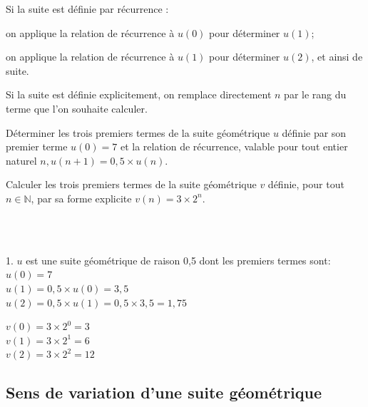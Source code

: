 \begin{methode}
	\begin{enumMet}
		\item Si la suite est définie par récurrence :
		\begin{itemMet}
			\item on applique la relation de récurrence à $u(0)$ pour déterminer $u(1)$;
			\item on applique la relation de récurrence à $u(1)$ pour déterminer $u(2)$, et ainsi de suite.
		\end{itemMet}
		\item Si la suite est définie explicitement, on remplace directement $n$ par le rang du terme que l'on souhaite calculer.
	\end{enumMet}
	
\end{methode}

\begin{exemple}
	\begin{enumEx}
		\item Déterminer les trois premiers termes de la suite géométrique $u$ définie par son premier terme $u(0)=7$ et la relation de récurrence, valable pour tout entier naturel $n, u(n+1)=0,5 \times u(n)$.
		\item Calculer les trois premiers termes de la suite géométrique $v$ définie, pour tout $n \in \mathbb{N}$, par sa forme explicite $v(n)=3 \times 2^n$.
	\end{enumEx}
	\ \\
	\\
	\begin{enumEx}
		\item 1. $u$ est une suite géométrique de raison 0,5 dont les premiers termes sont:
		$u(0)=7$\\
		$u(1)=0,5 \times u(0)=3,5$\\
		$u(2)=0,5 \times u(1)=0,5 \times 3,5=1,75$
		\item $v(0)=3 \times 2^0=3$ \\
		$v(1)=3 \times 2^1=6$\\
		$v(2)=3 \times 2^2=12$
	\end{enumEx}
\end{exemple}


\subsection{Sens de variation d'une suite géométrique}

